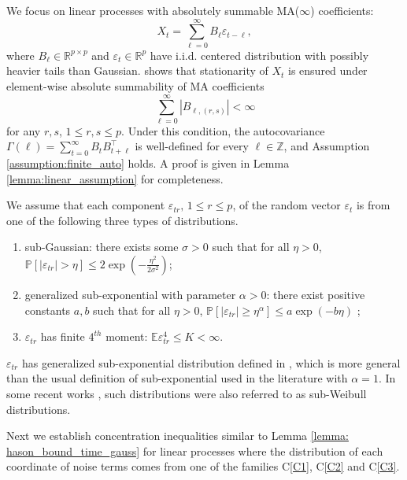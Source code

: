 We focus on linear processes with absolutely summable MA($\infty$) coefficients:
\begin{equation}
\label{eq:infinite_ma}
    X_t = \sum_{\ell = 0}^\infty B_\ell \varepsilon_{t-\ell},
\end{equation}
where $B_\ell\in \mathbb{R}^{p\times p}$ and $\varepsilon_t\in \mathbb{R}^p$ have i.i.d. centered distribution with possibly heavier tails than Gaussian. \citet{rosenblatt1985stationary} shows that stationarity of $X_t$ is ensured under element-wise absolute summability of MA coefficients
\begin{equation}
\label{eq:infinity_moving_average}
    \sum_{\ell=0}^\infty |B_{\ell, (r,s)}| < \infty 
\end{equation}
for any $r,s$, $1\le r, s\le p$. Under this condition, the autocovariance $\Gamma(\ell) = \sum_{t=0}^\infty B_{t}B_{t+\ell}^\top$ is well-defined for every $\ell \in \mathbb{Z}$, and Assumption \ref{assumption:finite_auto} holds. A proof is given in Lemma \ref{lemma:linear_assumption} for completeness.\par 
We assume that each component $\varepsilon_{tr}, \, 1 \le r \le p$, of the random vector $\varepsilon_t$ is from one of the following three types of distributions. 
\begin{enumerate}[(C1)]
    \item sub-Gaussian: there exists some $\sigma>0$ such that for all $\eta > 0$,   $\mathbb{P}[|\varepsilon_{tr}|>\eta]\le 2\exp\left(-\frac{\eta^2}{2\sigma^2}\right)$; %
    \label{C1} 
    \item generalized sub-exponential with parameter $\alpha>0$: there exist positive constants $a, b$ such that for all $\eta > 0$,  
    $\mathbb{P}[|\varepsilon_{tr}|\ge \eta^\alpha]\le a\exp(-b\eta)$ \citep{erdHos2012bulk};
    \label{C2}
    \item $\varepsilon_{tr}$ has finite $4^{th}$ moment: $\mathbb{E} \varepsilon_{tr}^4 \le K <\infty$.  \label{C3}
\end{enumerate}
\begin{remark}
$\varepsilon_{tr}$ has generalized sub-exponential distribution defined in \citet{erdHos2012bulk}, which is more general than the usual definition of sub-exponential used in the literature with $\alpha = 1$. In some recent works  \citep{FiniteTimeIdentification2017, wong2017lasso}, such distributions were also referred to as sub-Weibull distributions.
\end{remark}
Next we establish concentration inequalities similar to Lemma \ref{lemma: hason_bound_time_gauss} for linear processes where the distribution of each coordinate of  noise terms comes from one of the  families C\ref{C1}, C\ref{C2} and C\ref{C3}. 

